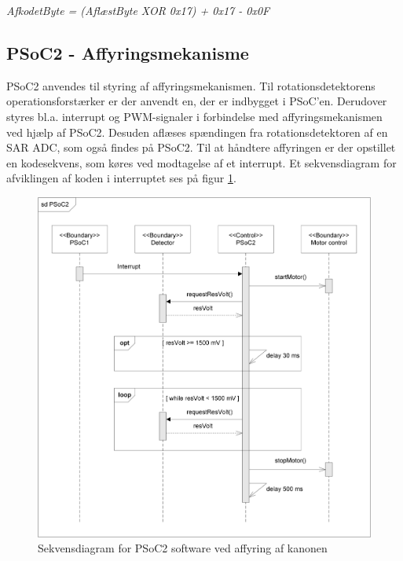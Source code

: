 \textit{AfkodetByte = (AflæstByte XOR 0x17) + 0x17 - 0x0F}


\subsection{PSoC2 - Affyringsmekanisme}

PSoC2 anvendes til styring af affyringsmekanismen. Til rotationsdetektorens operationsforstærker er der anvendt en, der er indbygget i PSoC'en. Derudover styres bl.a. interrupt og PWM-signaler i forbindelse med affyringsmekanismen ved hjælp af PSoC2. Desuden aflæses spændingen fra rotationsdetektoren af en SAR ADC, som også findes på PSoC2. Til at håndtere affyringen er der opstillet en kodesekvens, som køres ved modtagelse af et interrupt. Et sekvensdiagram for afviklingen af koden i interruptet ses på figur \ref{fig:aktivitetsdiagramDetektor}. \\

 \begin{figure}[H]
 	\centering
 	\includegraphics[width=1\textwidth]{Afsnit/DesignOgImplementering/images/PSoC2sekvens.png}
 	\caption{Sekvensdiagram for PSoC2 software ved affyring af kanonen} 
 	\label{fig:aktivitetsdiagramDetektor}
 \end{figure}

